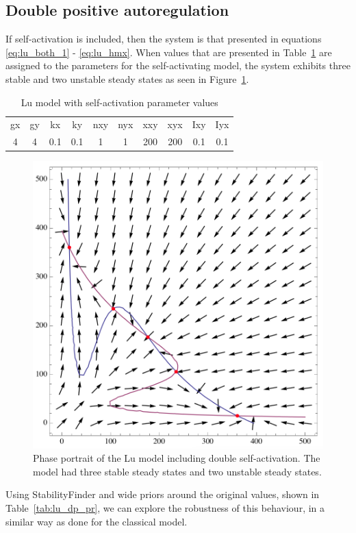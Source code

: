 \subsection{Double positive autoregulation}
If self-activation is included, then the system is that presented in equations \ref{eq:lu_both_1} - \ref{eq:lu_hmx}. When values that are presented in Table~\ref{tab:lu_dp_tri} are assigned to the parameters for the self-activating model, the system exhibits three stable and two unstable steady states as seen in Figure~\ref{fig:lu_tri_phse}. 

\begin{table}[h]
\centering
\caption{Lu model with self-activation parameter values}
\label{tab:lu_dp_tri}
\begin{tabular}{cccccccccc}
gx    & gy    & kx    & ky    & nxy & nyx & xxy     & xyx     & Ixy   & Iyx \\
4&4     &0.1   & 0.1   &  1  &  1  &  200    &  200    & 0.1    &   0.1
\end{tabular}
\end{table}

\begin{figure}[h]
\centering
\includegraphics[scale=0.3]{chapterStabilityFinder/Lu_switches/images/mae/tristable_db.png}
\caption[Phase portrait of the Lu model including double self-activation]{Phase portrait of the Lu model including double self-activation. The model had three stable steady states and two unstable steady states.}
\label{fig:lu_tri_phse}
\end{figure}
\clearpage
Using StabilityFinder and wide priors around the original values, shown in Table~\ref{tab:lu_dp_pr}, we can explore the robustness of this behaviour, in a similar way as done for the classical model. 


